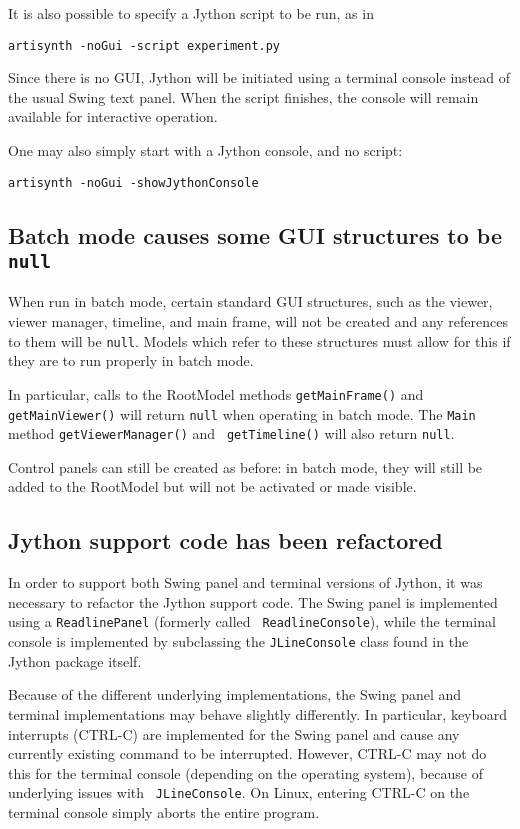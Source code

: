 \documentclass{article}
\begin{document}
It is also possible to specify a Jython script to be run, as in
%
\begin{lstlisting}[]
   artisynth -noGui -script experiment.py
\end{lstlisting}
%
Since there is no GUI, Jython will be initiated using a terminal
console instead of the usual Swing text panel. When the script
finishes, the console will remain available for interactive operation.

One may also simply start with a Jython console, and no script:
%
\begin{lstlisting}[]
   artisynth -noGui -showJythonConsole
\end{lstlisting}
%

\subsection*{Batch mode causes some GUI structures to be {\tt null}}

When run in batch mode, certain standard GUI structures, such as the
viewer, viewer manager, timeline, and main frame, will not be created
and any references to them will be {\tt null}. Models which refer to
these structures must allow for this if they are to run properly in
batch mode.

In particular, calls to the RootModel methods {\tt getMainFrame()} and
{\tt getMainViewer()} will return {\tt null} when operating in batch
mode. The {\tt Main} method {\tt getViewerManager()} and {\tt
getTimeline()} will also return {\tt null}.

Control panels can still be created as before: in batch mode, they
will still be added to the RootModel but will not be activated or made
visible.

\subsection*{Jython support code has been refactored}

In order to support both Swing panel and terminal versions of Jython,
it was necessary to refactor the Jython support code. The Swing panel
is implemented using a {\tt ReadlinePanel} (formerly called {\tt
ReadlineConsole}), while the terminal console is implemented by
subclassing the {\tt JLineConsole} class found in the Jython package
itself.

Because of the different underlying implementations, the Swing panel
and terminal implementations may behave slightly differently.  In
particular, keyboard interrupts (CTRL-C) are implemented for the Swing
panel and cause any currently existing command to be interrupted.
However, CTRL-C may not do this for the terminal console (depending on
the operating system), because of underlying issues with {\tt
JLineConsole}. On Linux, entering CTRL-C on the terminal console
simply aborts the entire program.
\end{document}
